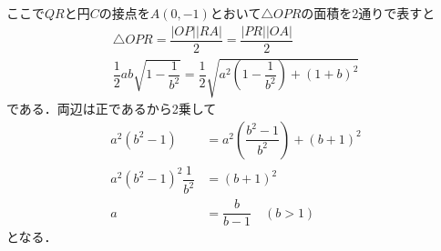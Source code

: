 \documentclass[../../main.tex]{subfiles}
\begin{document}
ここで$QR$と円$C$の接点を$A(0,-1)$とおいて$\triangle OPR$の面積を2通りで表すと
\begin{align}
  \triangle OPR = \dfrac{|OP||RA|}{2} = \dfrac{|PR||OA|}{2} \\
  \dfrac{1}{2}ab\sqrt{1-\dfrac{1}{b^2}} = \dfrac{1}{2}\sqrt{a^2\left(1-\dfrac{1}{b^2}\right) + (1+b)^2}
\end{align}
である．両辺は正であるから2乗して
\begin{align}
  a^2(b^2-1) &= a^2\left(\dfrac{b^2-1}{b^2}\right) + (b+1)^2 \\
  a^2(b^2-1)^2\dfrac{1}{b^2} &= (b+1)^2 \\
  a &= \dfrac{b}{b-1} \quad (b>1)
\end{align}
となる．
\end{document}
